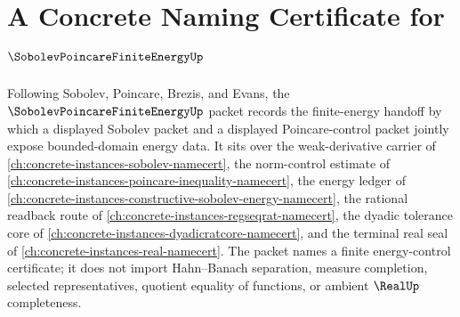 \chapter{A Concrete Naming Certificate for $\SobolevPoincareFiniteEnergyUp$}
\label{ch:concrete-instances-sobolev-poincare-finite-energy-namecert}

Following Sobolev, Poincare, Brezis, and Evans, the $\SobolevPoincareFiniteEnergyUp$ packet records the finite-energy handoff by which a displayed Sobolev packet and a displayed Poincare-control packet jointly expose bounded-domain energy data. It sits over the weak-derivative carrier of \autoref{ch:concrete-instances-sobolev-namecert}, the norm-control estimate of \autoref{ch:concrete-instances-poincare-inequality-namecert}, the energy ledger of \autoref{ch:concrete-instances-constructive-sobolev-energy-namecert}, the rational readback route of \autoref{ch:concrete-instances-regseqrat-namecert}, the dyadic tolerance core of \autoref{ch:concrete-instances-dyadicratcore-namecert}, and the terminal real seal of \autoref{ch:concrete-instances-real-namecert}. The packet names a finite energy-control certificate; it does not import Hahn--Banach separation, measure completion, selected representatives, quotient equality of functions, or ambient $\RealUp$ completeness.

